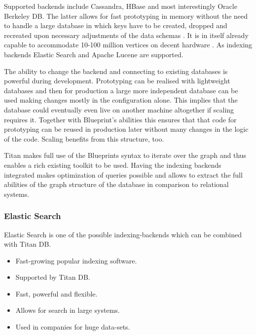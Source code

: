\documentclass[twoside, 11pt]{scrartcl}
\begin{document}
Supported backends include Cassandra, HBase and most interestingly Oracle Berkeley DB. The latter allows for fast prototyping in memory without the need to handle a large database in which keys have to be created, dropped and recreated upon necessary adjustments of the data schemas \cite{link:berkeleyDB}. It is in itself already capable to accommodate 10-100 million vertices on decent hardware \cite{link:titanWithBerkeley}. As indexing backends Elastic Search and Apache Lucene are supported.

The ability to change the backend and connecting to existing databases is powerful during development. Prototyping can be realised with lightweight databases and then for production a large more independent database can be used making changes mostly in the configuration alone. This implies that the database  could eventually even live on another machine altogether if scaling requires it. Together with Blueprint's abilities this ensures that that code for prototyping can be  reused in production later without many changes in the logic of the code. Scaling benefits from this structure, too. 

Titan makes full use of the Blueprints syntax to iterate over the graph and thus enables a rich existing toolkit to be used.
Having the indexing backends integrated makes optimization of queries possible and allows to extract the full abilities of the graph structure of the database in comparison to relational systems.

\subsubsection{Elastic Search}
Elastic Search is one of the possible indexing-backends which can be combined with Titan DB. 

\begin{itemize}
	\item Fast-growing popular indexing software.
	\item Supported by Titan DB.
	\item Fast, powerful and flexible.
	\item Allows for search in large systems.
	\item Used in companies for huge data-sets.
\end{itemize}
\end{document}
